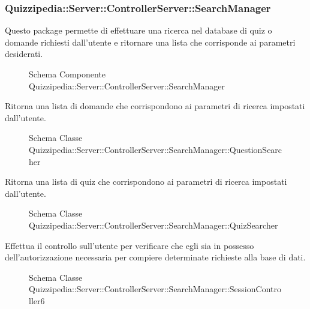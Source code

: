 \subsubsection{Quizzipedia::Server::ControllerServer::SearchManager}
Questo package permette di effettuare una ricerca nel database di quiz o domande richiesti dall'utente e ritornare una lista che corrisponde ai parametri desiderati.
\begin{figure}[H]
\centering
\noindent{}
\caption{Schema Componente Quizzipedia::Server::ControllerServer::SearchManager}
\end{figure}
Ritorna una lista di domande che corrispondono ai parametri di ricerca impostati dall'utente.
\begin{figure}[H]
\centering
\noindent{}
\caption{Schema Classe Quizzipedia::Server::ControllerServer::SearchManager::QuestionSearcher}
\end{figure}
Ritorna una lista di quiz che corrispondono ai parametri di ricerca impostati dall'utente.
\begin{figure}[H]
\centering
\noindent{}
\caption{Schema Classe Quizzipedia::Server::ControllerServer::SearchManager::QuizSearcher}
\end{figure}
Effettua il controllo sull'utente per verificare che egli sia in possesso dell'autorizzazione necessaria per compiere determinate richieste alla base di dati.
\begin{figure}[H]
\centering
\noindent{}
\caption{Schema Classe Quizzipedia::Server::ControllerServer::SearchManager::SessionController6}
\end{figure}

